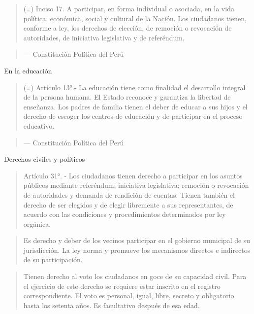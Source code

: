 \documentclass[
]{book}
\begin{document}
\begin{quote}
(\ldots) Inciso 17. A participar, en forma individual o asociada, en la vida política, económica,
social y cultural de la Nación. Los ciudadanos tienen, conforme a ley, los
derechos de elección, de remoción o revocación de autoridades, de
iniciativa legislativa y de referéndum.
\end{quote}

\begin{quote}
--- Constitución Política del Perú
\end{quote}

En la educación

\begin{quote}
(\ldots) Artículo 13°.- La educación tiene como finalidad el desarrollo integral de la
persona humana. El Estado reconoce y garantiza la libertad de enseñanza. Los
padres de familia tienen el deber de educar a sus hijos y el derecho de escoger
los centros de educación y de participar en el proceso educativo.
\end{quote}

\begin{quote}
--- Constitución Política del Perú
\end{quote}

Derechos civiles y políticos

\begin{quote}
Artículo 31°. - Los ciudadanos tienen derecho a participar en los asuntos públicos
mediante referéndum; iniciativa legislativa; remoción o revocación de autoridades
y demanda de rendición de cuentas. Tienen también el derecho de ser elegidos y
de elegir libremente a sus representantes, de acuerdo con las condiciones y
procedimientos determinados por ley orgánica.
\end{quote}

\begin{quote}
Es derecho y deber de los vecinos participar en el gobierno municipal de su
jurisdicción. La ley norma y promueve los mecanismos directos e indirectos de su
participación.
\end{quote}

\begin{quote}
Tienen derecho al voto los ciudadanos en goce de su capacidad civil. Para el
ejercicio de este derecho se requiere estar inscrito en el registro correspondiente.
El voto es personal, igual, libre, secreto y obligatorio hasta los setenta años. Es
facultativo después de esa edad.
\end{quote}
\end{document}
